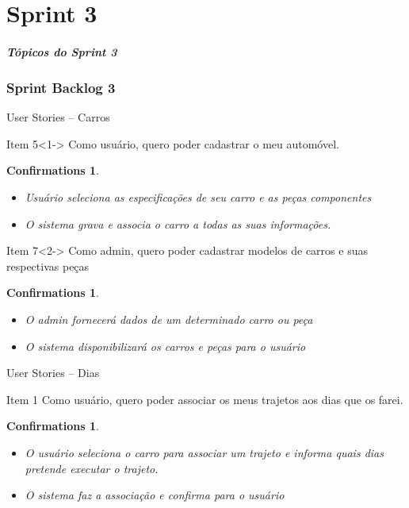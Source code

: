 \documentclass[hyperref={pdfpagelabels=false},11pt]{beamer}
\newtheorem{confirmations}[theorem]{Confirmations}
\begin{document}
	\part{Sprint 3}
	
		\begin{frame}
			\frametitle{Tópicos do Sprint 3}
			\tableofcontents[pausesections]
		\end{frame}	
	
		\section{Sprint Backlog 3}
			\begin{frame}{User Stories -- Carros}
				\begin{block}{Item 5}<1->
					Como usuário, quero poder cadastrar o meu automóvel.
					\begin{confirmations}
						\begin{itemize}
							\tiny\item Usuário seleciona as especificações de seu carro e as peças componentes
							\tiny\item O sistema grava e associa o carro a todas as suas informações.
						\end{itemize}
					\end{confirmations}
				\end{block}
				
				\begin{block}{Item 7}<2->
					Como admin, quero poder cadastrar modelos de carros e suas respectivas peças
					\begin{confirmations}
						\begin{itemize}
							\tiny\item O admin fornecerá dados de um determinado carro ou peça
							\tiny\item O sistema disponibilizará os carros e peças para o usuário
						\end{itemize}
					\end{confirmations}
				\end{block}
			\end{frame}
			
			\begin{frame}{User Stories -- Dias}
				\begin{block}{Item 1}
					Como usuário, quero poder associar os meus trajetos aos dias que os farei.
					\begin{confirmations}
						\begin{itemize}
							\item O usuário seleciona o carro para associar um trajeto e informa quais dias pretende executar o trajeto.
							\item O sistema faz a associação e confirma para o usuário
						\end{itemize}
					\end{confirmations}
				\end{block}
			\end{frame}
					
\end{document}
